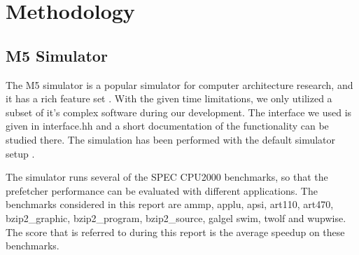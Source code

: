 \section{Methodology}

\subsection{M5 Simulator}

The M5 simulator is a popular simulator for computer architecture research, and
it has a rich feature set \cite{user_doc}. With the given time limitations, we only utilized a
subset of it’s complex software during our development. The interface we used is
given in interface.hh and a short documentation of the functionality can be
studied there. The simulation has been performed with the default simulator
setup .

The simulator runs several of the SPEC CPU2000 benchmarks, so that the prefetcher 
performance can be evaluated with different applications. 
The benchmarks considered in this report are ammp, applu, apsi, art110, art470, 
bzip2_graphic, bzip2_program, bzip2_source, galgel swim, twolf and wupwise.
The score that is referred to during this report is the average speedup on these benchmarks.


